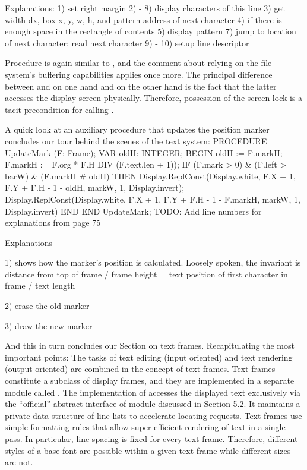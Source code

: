 Explanations:
1) set right margin
2) - 8) display characters of this line
3) get width dx, box x, y, w, h, and pattern address of next character
4) if there is enough space in the rectangle of contents
5) display pattern
7) jump to location of next character; read next character
9) - 10) setup line descriptor

Procedure  is again similar to , and the comment about relying on the file system’s buffering capabilities applies once more. The principal difference between  and  on one hand and  on the other hand is the fact that the latter accesses the display screen physically. Therefore, possession of the screen lock is a tacit precondition for calling .

A quick look at an auxiliary procedure that updates the position marker concludes our tour behind the scenes of the text system:
\begintt
PROCEDURE UpdateMark (F: Frame);
VAR oldH: INTEGER;
BEGIN
oldH := F.markH; F.markH := F.org * F.H DIV (F.text.len + 1)); IF (F.mark > 0) & (F.left >= barW) & (F.markH # oldH) THEN
Display.ReplConst(Display.white, F.X + 1, F.Y + F.H - 1 - oldH, markW, 1, Display.invert);
Display.ReplConst(Display.white, F.X + 1, F.Y + F.H - 1 - F.markH, markW, 1, Display.invert) END
END UpdateMark;
\endtt
TODO: Add line numbers for explanations from page 75

Explanations

1) shows how the marker's position is calculated. Loosely spoken, the invariant is distance from top of frame / frame height = text position of first character in frame / text length

2) erase the old marker

3) draw the new marker

And this in turn concludes our Section on text frames. Recapitulating the most important points: The tasks of text editing (input oriented) and text rendering (output oriented) are combined in the concept of text frames. Text frames constitute a subclass of display frames, and they are implemented in a separate module called . The implementation of  accesses the displayed text exclusively via the ``official'' abstract interface of module  discussed in Section 5.2. It maintains a private data structure of line lists to accelerate locating requests. Text frames use simple formatting rules that allow super-efficient rendering of text in a single pass. In particular, line spacing is fixed for every text frame. Therefore, different styles of a base font are possible within a given text frame while different sizes are not.

